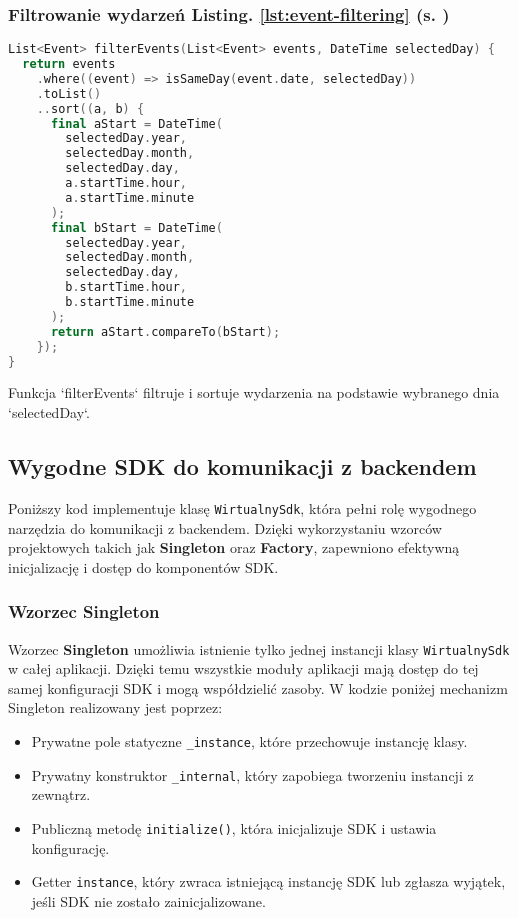 \subsubsection{Filtrowanie wydarzeń \textbf{Listing. \ref{lst:event-filtering} (s. \pageref{lst:event-filtering})}}
\begin{lstlisting}[language=C++, caption=Filtrowanie wydarzeń, label={lst:event-filtering}]
List<Event> filterEvents(List<Event> events, DateTime selectedDay) {
  return events
    .where((event) => isSameDay(event.date, selectedDay))
    .toList()
    ..sort((a, b) {
      final aStart = DateTime(
        selectedDay.year, 
        selectedDay.month, 
        selectedDay.day,
        a.startTime.hour,
        a.startTime.minute
      );
      final bStart = DateTime(
        selectedDay.year,
        selectedDay.month,
        selectedDay.day,
        b.startTime.hour,
        b.startTime.minute
      );
      return aStart.compareTo(bStart);
    });
}
\end{lstlisting}
Funkcja `filterEvents` filtruje i sortuje wydarzenia na podstawie wybranego dnia `selectedDay`.

\subsection{Wygodne SDK do komunikacji z backendem}

Poniższy kod implementuje klasę \texttt{WirtualnySdk}, która pełni rolę wygodnego narzędzia do komunikacji z backendem. Dzięki wykorzystaniu wzorców projektowych takich jak \textbf{Singleton} oraz \textbf{Factory}, zapewniono efektywną inicjalizację i dostęp do komponentów SDK.

\subsubsection{Wzorzec Singleton}
Wzorzec \textbf{Singleton} umożliwia istnienie tylko jednej instancji klasy \texttt{WirtualnySdk} w całej aplikacji. Dzięki temu wszystkie moduły aplikacji mają dostęp do tej samej konfiguracji SDK i mogą współdzielić zasoby. W kodzie poniżej mechanizm Singleton realizowany jest poprzez:

\begin{itemize}
  \item Prywatne pole statyczne \texttt{\_instance}, które przechowuje instancję klasy.
  \item Prywatny konstruktor \texttt{\_internal}, który zapobiega tworzeniu instancji z zewnątrz.
  \item Publiczną metodę \texttt{initialize()}, która inicjalizuje SDK i ustawia konfigurację.
  \item Getter \texttt{instance}, który zwraca istniejącą instancję SDK lub zgłasza wyjątek, jeśli SDK nie zostało zainicjalizowane.
\end{itemize}

